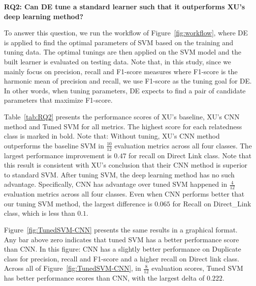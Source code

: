 \documentclass[sigconf,review, anonymous]{acmart}
\theoremstyle{break}
\newcommand{\fig}[1]{Figure~\ref{fig:#1}}
\newcommand{\tab}[1]{Table~\ref{tab:#1}}
\begin{document}
 
\textbf{RQ2: Can DE tune a standard learner such that it outperforms XU's deep learning method?}

To answer this question, we run the workflow of \fig{workflow}, where DE is applied to 
find the optimal parameters of SVM based on the training and tuning data. The optimal tunings are then applied on the SVM model and  the built learner is evaluated on testing data. Note that, in this study,
since we mainly focus on {precision}, {recall} and {F1-score} measures where {F1-score} is the
harmonic mean of {precision} and {recall}, we use {F1-score} as the tuning goal for DE.
In other words, when tuning parameters,  DE expects to find a pair of candidate parameters that maximize
 F1-score. 


\tab{RQ2} presents the performance scores of  XU's baseline, XU's CNN method and Tuned SVM 
for all metrics. The highest score for each relatedness class
  is marked in bold.  Note that: Without tuning, XU's CNN method outperforms
the baseline SVM in $\frac{10}{12}$ evaluation metrics across all four classes. 
The largest performance improvement is $0.47$ for {recall} on {Direct Link} class. Note that this result is consistent with XU's conclusion
that their CNN method is superior to standard SVM.
After tuning SVM, the deep learning method has no such advantage. Specifically, CNN has advantage over tuned SVM happened in $\frac{4}{12}$ evaluation metrics across all four classes. Even when CNN performs better that our tuning SVM method,
the largest difference is $0.065$ for Recall on Direct\_Link class, which is less than $0.1$. 

\fig{TunedSVM-CNN} presents the same results in a graphical format.
Any bar above zero indicates that tuned SVM has
a better performance score than CNN.
In this figure: CNN has a slightly better performance on
{Duplicate} class for {precision}, {recall} and {F1-score} and
a higher {recall} on {Direct link} class.  Across all of \fig{TunedSVM-CNN},
in $\frac{8}{12}$ evaluation scores, Tuned SVM has better performance scores than CNN, with the largest delta of $0.222$.

\end{document}
